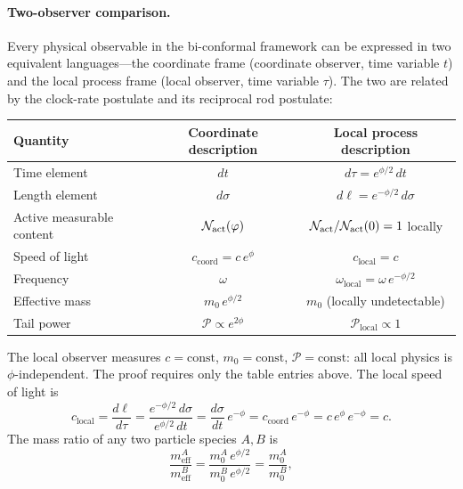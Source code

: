 \documentclass[11pt]{article}
\begin{document}
\paragraph{Two-observer comparison.}
Every physical observable in the bi-conformal framework can be
expressed in two equivalent languages---the coordinate frame
(coordinate observer, time variable $t$) and the local process frame
(local observer, time variable $\tau$).  The two are related by
the clock-rate postulate and its reciprocal rod postulate:
\begin{center}
\renewcommand{\arraystretch}{1.4}
\begin{tabular}{@{}lcc@{}}
\toprule
Quantity & Coordinate description & Local process description \\
\midrule
Time element & $dt$ & $d\tau = e^{\phi/2}\,dt$ \\
Length element & $d\sigma$ & $d\ell = e^{-\phi/2}\,d\sigma$ \\
Active measurable content & $\mathcal N_{\rm act}(\phi)$ &
  $\mathcal N_{\rm act}/\mathcal N_{\rm act}(0)=1$ locally \\
Speed of light & $c_{\mathrm{coord}} = c\,e^{\phi}$ & $c_{\mathrm{local}} = c$ \\
Frequency & $\omega$ & $\omega_{\mathrm{local}} = \omega\,e^{-\phi/2}$ \\
Effective mass & $m_0\,e^{\phi/2}$ & $m_0$ (locally undetectable) \\
Tail power & $\mathcal{P}\propto e^{2\phi}$ & $\mathcal{P}_{\mathrm{local}}\propto 1$ \\
\bottomrule
\end{tabular}
\end{center}
\noindent
The local observer measures $c=\mathrm{const}$,
$m_0=\mathrm{const}$, $\mathcal{P}=\mathrm{const}$: all local
physics is $\phi$-independent.  The proof requires only the table
entries above.  The local speed of light is
\begin{equation}\label{eq:clocal_proof_app18}
  c_{\mathrm{local}}
  = \frac{d\ell}{d\tau}
  = \frac{e^{-\phi/2}\,d\sigma}{e^{\phi/2}\,dt}
  = \frac{d\sigma}{dt}\,e^{-\phi}
  = c_{\mathrm{coord}}\,e^{-\phi}
  = c\,e^{\phi}\,e^{-\phi}
  = c.
\end{equation}
The mass ratio of any two particle species $A,B$ is
\begin{equation}\label{eq:massratio_proof_app18}
  \frac{m_{\mathrm{eff}}^A}{m_{\mathrm{eff}}^B}
  = \frac{m_0^A\,e^{\phi/2}}{m_0^B\,e^{\phi/2}}
  = \frac{m_0^A}{m_0^B},
\end{equation}
\end{document}
